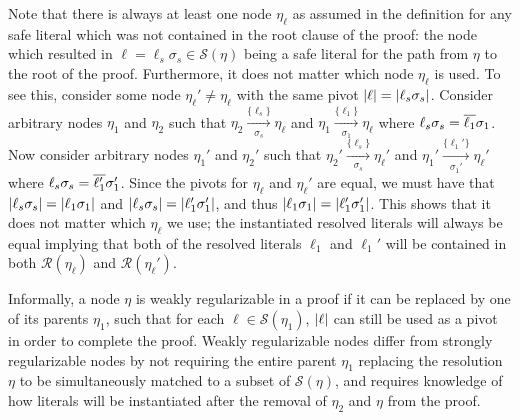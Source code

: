 Note that there is always at least one node $\eta_\ell$ as assumed in the definition for any safe literal which was not contained in the root clause of the proof: the node which resulted in $\ell = \ell_s\sigma_s \in \mathcal{S}(\eta)$ being a safe literal for the path from $\eta$ to the root of the proof. Furthermore, it does not matter which node $\eta_\ell$ is used. To see this, consider some node $\eta_\ell' \neq \eta_\ell$ with the same pivot $\lvert\ell\rvert=\lvert\ell_s\sigma_s\rvert$. Consider arbitrary nodes $\eta_1$ and $\eta_2$ such that  $\eta_2 \xrightarrow[\sigma_s]{\{\ell_s\} } \eta_\ell$ and $\eta_1 \xrightarrow[\sigma_1]{\{\ell_1\} } \eta_\ell$ where $\ell_s\sigma_s=\overline{\ell_1}\sigma_1$. Now consider arbitrary nodes $\eta_1'$ and $\eta_2'$ such that  $\eta_2' \xrightarrow[\sigma_s]{\{\ell_s\} } \eta_\ell'$ and $\eta_1' \xrightarrow[\sigma_1']{\{\ell_1'\} } \eta_\ell'$ where $\ell_s\sigma_s=\overline{\ell_1'}\sigma_1'$. Since the pivots for $\eta_\ell$ and $\eta_\ell'$ are equal, we must have that %
$\lvert\ell_s\sigma_s\rvert=\lvert\ell_1\sigma_1\rvert$ and $\lvert\ell_s\sigma_s\rvert=\lvert\ell_1'\sigma_1'\rvert$, and thus $\lvert\ell_1\sigma_1\rvert=\lvert\ell_1'\sigma_1'\rvert$. This shows that it does not matter which $\eta_\ell$ we use; the instantiated resolved literals will always be equal implying that both of the resolved literals $\ell_1$ and $\ell_1'$ will be contained in both $\mathcal{R}(\eta_\ell)$ and $\mathcal{R}(\eta_\ell')$.


Informally, a node $\eta$ is weakly regularizable in a proof if it can be replaced by one of its parents $\eta_1$, such that for each $\ell \in \mathcal{S}(\eta_1)$, $\lvert\ell\rvert$ can still be used as a pivot in order to complete the proof. Weakly regularizable nodes differ from strongly regularizable nodes by not requiring the entire parent $\eta_1$ replacing the resolution $\eta$ to be simultaneously matched to a subset of $\mathcal{S}(\eta)$, and requires knowledge of how literals will be instantiated after the removal of $\eta_2$ and $\eta$ from the proof.




